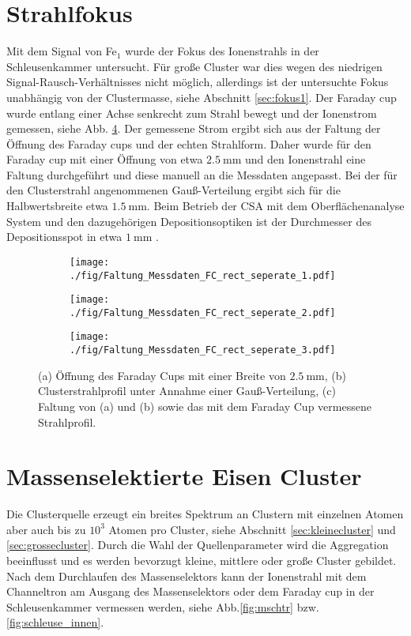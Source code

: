 \section{Strahlfokus}
\label{sec:strahlfokus}
Mit dem  Signal von Fe$_1$ wurde der Fokus des Ionenstrahls in der Schleusenkammer untersucht.
Für große Cluster war dies wegen des niedrigen Signal-Rausch-Verhältnisses nicht möglich, allerdings ist der untersuchte Fokus unabhängig von der Clustermasse, siehe Abschnitt \ref{sec:fokus1}.
Der Faraday cup wurde entlang einer Achse senkrecht zum Strahl bewegt und der Ionenstrom gemessen, siehe Abb. \ref{fig:faltung}.
Der gemessene Strom ergibt sich aus der Faltung der Öffnung des Faraday cups und der echten Strahlform.
Daher wurde für den Faraday cup mit einer Öffnung von etwa $\SI{2.5}{\mm}$ und den Ionenstrahl eine Faltung durchgeführt und diese manuell an die Messdaten angepasst.
Bei der für den Clusterstrahl angenommenen Gauß-Verteilung ergibt sich für die Halbwertsbreite etwa $\SI{1.5}{\mm}$.
Beim Betrieb der CSA mit dem Oberflächenanalyse System und den dazugehörigen Depositionsoptiken ist der Durchmesser des Depositionsspot in etwa $\SI{1}{\mm}$ \cite[S. 40]{gronhagen}.

\begin{figure}
  \begin{subfigure}[h]{1\textwidth}
    \texttt{[image: ./fig/Faltung\_Messdaten\_FC\_rect\_seperate\_1.pdf]}
    \caption{}
    \label{fig:faltung1}
  \end{subfigure}\hfill
  \begin{subfigure}[h]{1\textwidth}
    \texttt{[image: ./fig/Faltung\_Messdaten\_FC\_rect\_seperate\_2.pdf]}
    \caption{}
    \label{fig:faltung2}
  \end{subfigure}\hfill
  \begin{subfigure}[t]{1\textwidth}
    \texttt{[image: ./fig/Faltung\_Messdaten\_FC\_rect\_seperate\_3.pdf]}
    \caption{}
    \label{fig:faltung3}
  \end{subfigure}
  \caption{(a) Öffnung des Faraday Cups mit einer Breite von $\SI{2,5}{\mm}$, (b) Clusterstrahlprofil unter Annahme einer Gauß-Verteilung, (c) Faltung von (a) und (b) sowie das mit dem Faraday Cup vermessene Strahlprofil.}
  \label{fig:faltung}
\end{figure}

\section{Massenselektierte Eisen Cluster}
Die Clusterquelle erzeugt ein breites Spektrum an Clustern mit einzelnen Atomen aber auch bis zu $10^3$ Atomen pro Cluster, siehe Abschnitt \ref{sec:kleinecluster} und \ref{sec:grossecluster}.
Durch die Wahl der Quellenparameter wird die Aggregation beeinflusst und es werden bevorzugt kleine, mittlere oder große Cluster gebildet.
Nach dem Durchlaufen des Massenselektors kann der Ionenstrahl mit dem Channeltron am Ausgang des Massenselektors oder dem Faraday cup in der Schleusenkammer vermessen werden, siehe Abb.\ref{fig:mschtr} bzw. \ref{fig:schleuse_innen}.

